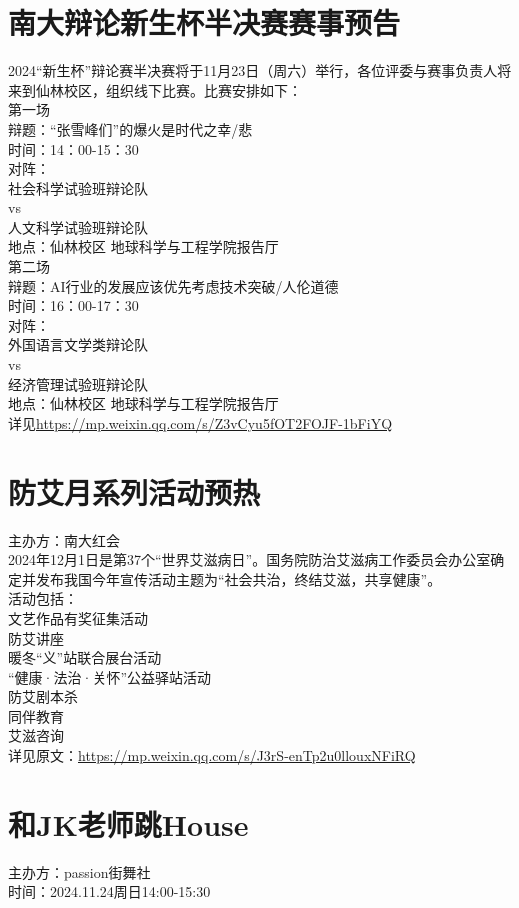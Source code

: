 \documentclass[letterpaper, 12pt]{article}
\begin{document}
\begin{multicols}{2}
\section{南大辩论新生杯半决赛赛事预告}
2024“新生杯”辩论赛半决赛将于11月23日（周六）举行，各位评委与赛事负责人将来到仙林校区，组织线下比赛。比赛安排如下：\\
第一场\\
辩题：“张雪峰们”的爆火是时代之幸/悲\\
时间：14：00-15：30\\
对阵：\\
社会科学试验班辩论队\\
vs \\
人文科学试验班辩论队\\
地点：仙林校区 地球科学与工程学院报告厅\\
第二场\\
辩题：AI行业的发展应该优先考虑技术突破/人伦道德\\
时间：16：00-17：30\\
对阵：\\
外国语言文学类辩论队\\ 
vs \\
经济管理试验班辩论队\\
地点：仙林校区 地球科学与工程学院报告厅\\
详见\url{https://mp.weixin.qq.com/s/Z3vCyu5fOT2FOJF-1bFiYQ}\\
\section{防艾月系列活动预热}
主办方：南大红会\\
2024年12月1日是第37个“世界艾滋病日”。国务院防治艾滋病工作委员会办公室确定并发布我国今年宣传活动主题为“社会共治，终结艾滋，共享健康”。\\
活动包括：\\
文艺作品有奖征集活动\\
防艾讲座\\
暖冬“义”站联合展台活动\\
“健康·法治·关怀”公益驿站活动\\
防艾剧本杀\\
同伴教育\\
艾滋咨询\\
详见原文：\url{https://mp.weixin.qq.com/s/J3rS-enTp2u0llouxNFiRQ}

\section{和JK老师跳House}
主办方：passion街舞社\\
时间：2024.11.24周日14:00-15:30


\end{multicols}
\end{document}

